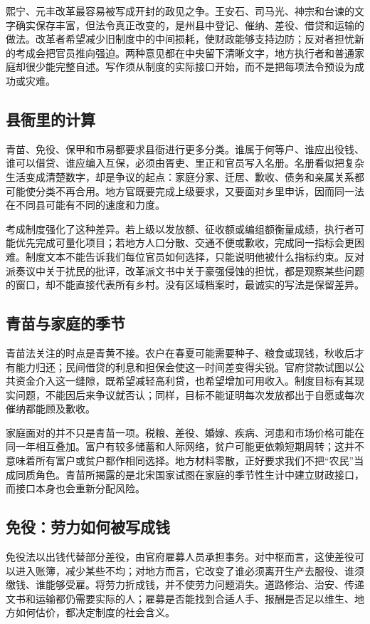 熙宁、元丰改革最容易被写成开封的政见之争。王安石、司马光、神宗和台谏的文字确实保存丰富，但法令真正改变的，是州县中登记、催纳、差役、借贷和运输的做法。改革者希望减少旧制度中的中间损耗，使财政能够支持边防；反对者担忧新的考成会把官员推向强迫。两种意见都在中央留下清晰文字，地方执行者和普通家庭却很少能完整自述。写作须从制度的实际接口开始，而不是把每项法令预设为成功或灾难。

\subsection{县衙里的计算}

青苗、免役、保甲和市易都要求县衙进行更多分类。谁属于何等户、谁应出役钱、谁可以借贷、谁应编入互保，必须由胥吏、里正和官员写入名册。名册看似把复杂生活变成清楚数字，却是争议的起点：家庭分家、迁居、歉收、债务和亲属关系都可能使分类不再合用。地方官既要完成上级要求，又要面对乡里申诉，因而同一法在不同县可能有不同的速度和力度。

考成制度强化了这种差异。若上级以发放额、征收额或编组额衡量成绩，执行者可能优先完成可量化项目；若地方人口分散、交通不便或歉收，完成同一指标会更困难。制度文本不能告诉我们每位官员如何选择，只能说明他被什么指标约束。反对派奏议中关于扰民的批评，改革派文书中关于豪强侵蚀的担忧，都是观察某些问题的窗口，却不能直接代表所有乡村。没有区域档案时，最诚实的写法是保留差异。

\subsection{青苗与家庭的季节}

青苗法关注的时点是青黄不接。农户在春夏可能需要种子、粮食或现钱，秋收后才有能力归还；民间借贷的利息和担保会使这一时间差变得尖锐。官府贷款试图以公共资金介入这一缝隙，既希望减轻高利贷，也希望增加可用收入。制度目标有其现实问题，不能因后来争议就否认；同样，目标不能证明每次发放都出于自愿或每次催纳都能顾及歉收。

家庭面对的并不只是青苗一项。税粮、差役、婚嫁、疾病、河患和市场价格可能在同一年相互叠加。富户有较多储蓄和人际网络，贫户可能更依赖短期周转；这并不意味着所有富户或贫户都作相同选择。地方材料零散，正好要求我们不把“农民”当成同质角色。青苗所揭露的是北宋国家试图在家庭的季节性生计中建立财政接口，而接口本身也会重新分配风险。

\subsection{免役：劳力如何被写成钱}

免役法以出钱代替部分差役，由官府雇募人员承担事务。对中枢而言，这使差役可以进入账簿，减少某些不均；对地方而言，它改变了谁必须离开生产去服役、谁须缴钱、谁能够受雇。将劳力折成钱，并不使劳力问题消失。道路修治、治安、传递文书和运输都仍需要实际的人；雇募是否能找到合适人手、报酬是否足以维生、地方如何估价，都决定制度的社会含义。

